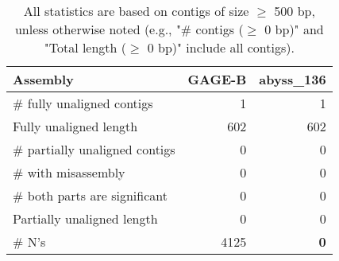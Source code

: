 \documentclass[12pt,a4paper]{article}
\begin{document}
\begin{table}[ht]
\begin{center}
\caption{All statistics are based on contigs of size $\geq$ 500 bp, unless otherwise noted (e.g., "\# contigs ($\geq$ 0 bp)" and "Total length ($\geq$ 0 bp)" include all contigs).}
\begin{tabular}{|l*{2}{|r}|}
\hline
Assembly & GAGE-B & abyss\_136 \\ \hline
\# fully unaligned contigs & 1 & 1 \\ \hline
Fully unaligned length & 602 & 602 \\ \hline
\# partially unaligned contigs & 0 & 0 \\ \hline
\hspace{5mm}\# with misassembly & 0 & 0 \\ \hline
\hspace{5mm}\# both parts are significant & 0 & 0 \\ \hline
Partially unaligned length & 0 & 0 \\ \hline
\# N's & 4125 & {\bf 0} \\ \hline
\end{tabular}
\end{center}
\end{table}
\end{document}
